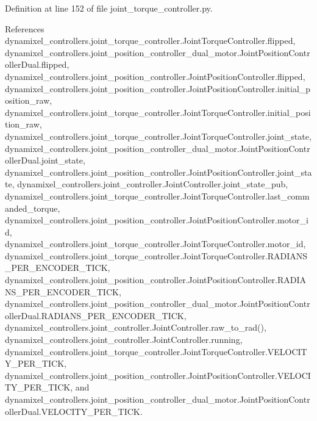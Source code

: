 Definition at line 152 of file joint\+\_\+torque\+\_\+controller.\+py.



References dynamixel\+\_\+controllers.\+joint\+\_\+torque\+\_\+controller.\+Joint\+Torque\+Controller.\+flipped, dynamixel\+\_\+controllers.\+joint\+\_\+position\+\_\+controller\+\_\+dual\+\_\+motor.\+Joint\+Position\+Controller\+Dual.\+flipped, dynamixel\+\_\+controllers.\+joint\+\_\+position\+\_\+controller.\+Joint\+Position\+Controller.\+flipped, dynamixel\+\_\+controllers.\+joint\+\_\+position\+\_\+controller.\+Joint\+Position\+Controller.\+initial\+\_\+position\+\_\+raw, dynamixel\+\_\+controllers.\+joint\+\_\+torque\+\_\+controller.\+Joint\+Torque\+Controller.\+initial\+\_\+position\+\_\+raw, dynamixel\+\_\+controllers.\+joint\+\_\+torque\+\_\+controller.\+Joint\+Torque\+Controller.\+joint\+\_\+state, dynamixel\+\_\+controllers.\+joint\+\_\+position\+\_\+controller\+\_\+dual\+\_\+motor.\+Joint\+Position\+Controller\+Dual.\+joint\+\_\+state, dynamixel\+\_\+controllers.\+joint\+\_\+position\+\_\+controller.\+Joint\+Position\+Controller.\+joint\+\_\+state, dynamixel\+\_\+controllers.\+joint\+\_\+controller.\+Joint\+Controller.\+joint\+\_\+state\+\_\+pub, dynamixel\+\_\+controllers.\+joint\+\_\+torque\+\_\+controller.\+Joint\+Torque\+Controller.\+last\+\_\+commanded\+\_\+torque, dynamixel\+\_\+controllers.\+joint\+\_\+position\+\_\+controller.\+Joint\+Position\+Controller.\+motor\+\_\+id, dynamixel\+\_\+controllers.\+joint\+\_\+torque\+\_\+controller.\+Joint\+Torque\+Controller.\+motor\+\_\+id, dynamixel\+\_\+controllers.\+joint\+\_\+torque\+\_\+controller.\+Joint\+Torque\+Controller.\+R\+A\+D\+I\+A\+N\+S\+\_\+\+P\+E\+R\+\_\+\+E\+N\+C\+O\+D\+E\+R\+\_\+\+T\+I\+CK, dynamixel\+\_\+controllers.\+joint\+\_\+position\+\_\+controller.\+Joint\+Position\+Controller.\+R\+A\+D\+I\+A\+N\+S\+\_\+\+P\+E\+R\+\_\+\+E\+N\+C\+O\+D\+E\+R\+\_\+\+T\+I\+CK, dynamixel\+\_\+controllers.\+joint\+\_\+position\+\_\+controller\+\_\+dual\+\_\+motor.\+Joint\+Position\+Controller\+Dual.\+R\+A\+D\+I\+A\+N\+S\+\_\+\+P\+E\+R\+\_\+\+E\+N\+C\+O\+D\+E\+R\+\_\+\+T\+I\+CK, dynamixel\+\_\+controllers.\+joint\+\_\+controller.\+Joint\+Controller.\+raw\+\_\+to\+\_\+rad(), dynamixel\+\_\+controllers.\+joint\+\_\+controller.\+Joint\+Controller.\+running, dynamixel\+\_\+controllers.\+joint\+\_\+torque\+\_\+controller.\+Joint\+Torque\+Controller.\+V\+E\+L\+O\+C\+I\+T\+Y\+\_\+\+P\+E\+R\+\_\+\+T\+I\+CK, dynamixel\+\_\+controllers.\+joint\+\_\+position\+\_\+controller.\+Joint\+Position\+Controller.\+V\+E\+L\+O\+C\+I\+T\+Y\+\_\+\+P\+E\+R\+\_\+\+T\+I\+CK, and dynamixel\+\_\+controllers.\+joint\+\_\+position\+\_\+controller\+\_\+dual\+\_\+motor.\+Joint\+Position\+Controller\+Dual.\+V\+E\+L\+O\+C\+I\+T\+Y\+\_\+\+P\+E\+R\+\_\+\+T\+I\+CK.


